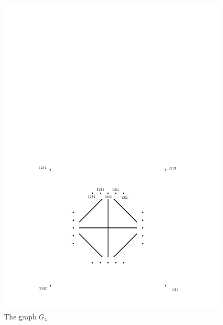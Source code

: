 \documentclass[runningheads]{llncs}
\begin{document}
\begin{figure}[ht]
  \centering
  \includegraphics[scale=0.4]{G4a.pdf}
  \caption{The graph $G_{4}$}
  \label{G4}
\end{figure}
\end{document}
